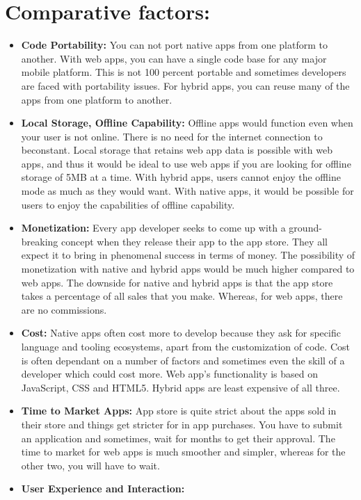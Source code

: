 \documentclass[14pt,a4paper,final]{extreport}
\begin{document}
\section{Comparative factors:}
\begin{itemize}
    \item \textbf{Code Portability:}
You can not port native apps from one platform to another. With web apps, you can have a single code base for any major mobile platform. This is not 100 percent portable and sometimes developers are faced with portability issues. For hybrid apps, you can reuse many of the apps from one platform to another.
    \item \textbf{Local Storage, Offline Capability:}
Offline apps would function even when your user is not online. There is no need for the internet connection to beconstant. Local storage that retains web app data is possible with web apps, and thus it would be ideal to use web apps if you are looking for offline storage of 5MB at a time. With hybrid apps, users cannot enjoy the offline mode as much as they would want. With native apps, it would be possible for users to enjoy the capabilities of offline capability.
    \item \textbf{Monetization:}
Every app developer seeks to come up with a ground- breaking concept when they release their app to the app store. They all expect it to bring in phenomenal success in terms of money. The possibility of monetization with native and hybrid apps would be much higher compared to web apps. The downside for native and hybrid apps is that the app store takes a percentage of all sales that you make. Whereas, for web apps, there are no commissions.
    \item \textbf{Cost:}
Native apps often cost more to develop because they ask for specific language and tooling ecosystems, apart from the customization of code. Cost is often dependant on a number of factors and sometimes even the skill of a developer which could cost more. Web app’s functionality is based on JavaScript, CSS and HTML5. Hybrid apps are least expensive of all three.
    \item \textbf{Time to Market Apps:}
App store is quite strict about the apps sold in their store and things get stricter for in app purchases. You have to submit an application and sometimes, wait for months to get their approval. The time to market for web apps is much smoother and simpler, whereas for the other two, you will have to wait.
    \item \textbf{User Experience and Interaction:}

\end{itemize}
\end{document}

